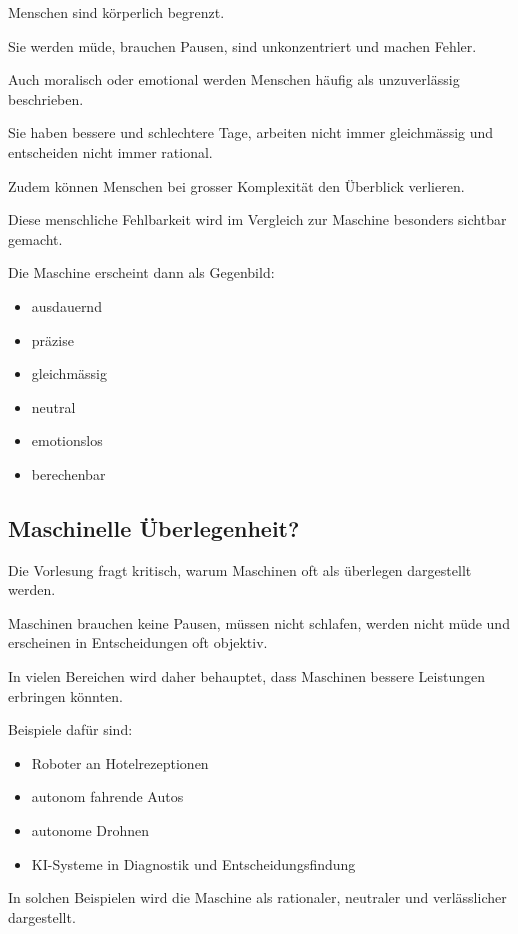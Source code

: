Menschen sind körperlich begrenzt.

Sie werden müde,
brauchen Pausen,
sind unkonzentriert
und machen Fehler.

Auch moralisch oder emotional
werden Menschen häufig als unzuverlässig beschrieben.

Sie haben bessere und schlechtere Tage,
arbeiten nicht immer gleichmässig
und entscheiden nicht immer rational.

Zudem können Menschen bei grosser Komplexität
den Überblick verlieren.

Diese menschliche Fehlbarkeit wird
im Vergleich zur Maschine besonders sichtbar gemacht.

Die Maschine erscheint dann als Gegenbild:

\begin{itemize}
\item ausdauernd
\item präzise
\item gleichmässig
\item neutral
\item emotionslos
\item berechenbar
\end{itemize}

\subsection{Maschinelle Überlegenheit?}

Die Vorlesung fragt kritisch,
warum Maschinen oft als überlegen dargestellt werden.

Maschinen brauchen keine Pausen,
müssen nicht schlafen,
werden nicht müde
und erscheinen in Entscheidungen oft objektiv.

In vielen Bereichen wird daher behauptet,
dass Maschinen bessere Leistungen erbringen könnten.

Beispiele dafür sind:

\begin{itemize}
\item Roboter an Hotelrezeptionen
\item autonom fahrende Autos
\item autonome Drohnen
\item KI-Systeme in Diagnostik und Entscheidungsfindung
\end{itemize}

In solchen Beispielen wird die Maschine
als rationaler,
neutraler und verlässlicher dargestellt.

